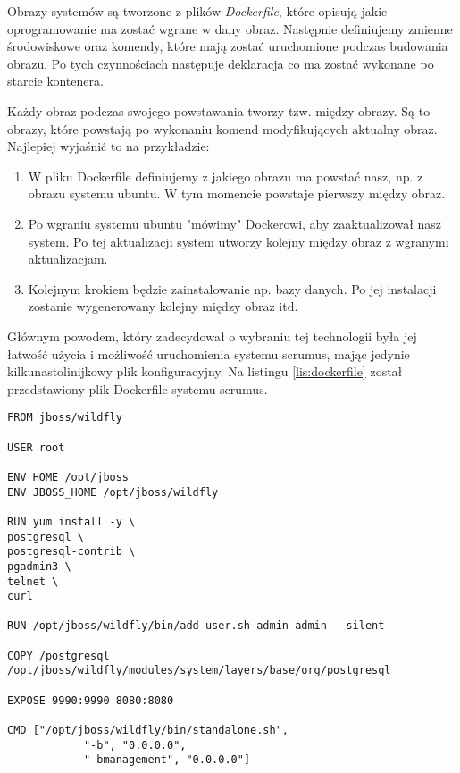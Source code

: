 Obrazy systemów są tworzone z plików \textit{Dockerfile}, które opisują jakie oprogramowanie ma zostać wgrane w dany obraz. Następnie definiujemy zmienne środowiskowe oraz komendy, które mają zostać uruchomione podczas budowania obrazu. Po tych czynnościach następuje deklaracja co ma zostać wykonane po starcie kontenera.

Każdy obraz podczas swojego powstawania tworzy tzw. między obrazy. Są to obrazy, które powstają po wykonaniu komend modyfikujących aktualny obraz. Najlepiej wyjaśnić to na przykładzie:

\begin{enumerate}
	\item W pliku Dockerfile definiujemy z jakiego obrazu ma powstać nasz, np. z obrazu systemu ubuntu. W tym momencie powstaje pierwszy między obraz.
	\item Po wgraniu systemu ubuntu "mówimy" Dockerowi, aby zaaktualizował nasz system. Po tej aktualizacji system utworzy kolejny między obraz z wgranymi aktualizacjam.
	\item Kolejnym krokiem będzie zainstalowanie np. bazy danych. Po jej instalacji zostanie wygenerowany kolejny między obraz itd.
\end{enumerate}

Głównym powodem, który zadecydował o wybraniu tej technologii była jej łatwość użycia i możliwość uruchomienia systemu scrumus, mając jedynie kilkunastolinijkowy plik konfiguracyjny. Na listingu \ref{lis:dockerfile} został przedstawiony plik Dockerfile systemu scrumus.

\begin{lstlisting}[caption={Plik Dockerfile systemu scrumus}, label=lis:dockerfile, numbers=none]
FROM jboss/wildfly

USER root

ENV HOME /opt/jboss
ENV JBOSS_HOME /opt/jboss/wildfly

RUN yum install -y \
postgresql \
postgresql-contrib \
pgadmin3 \
telnet \
curl

RUN /opt/jboss/wildfly/bin/add-user.sh admin admin --silent

COPY /postgresql /opt/jboss/wildfly/modules/system/layers/base/org/postgresql

EXPOSE 9990:9990 8080:8080

CMD ["/opt/jboss/wildfly/bin/standalone.sh", 
			"-b", "0.0.0.0", 
			"-bmanagement", "0.0.0.0"]\end{lstlisting}

